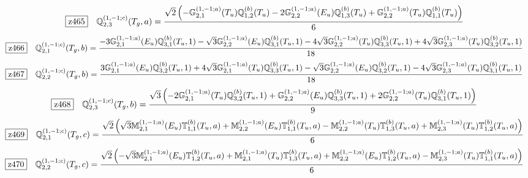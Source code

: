 \documentclass[fleqn,10pt,landscape]{jsarticle}
\begin{document}
\begin{dmath*}
\hspace*{3mm}\fbox{z465}\quad \mathbb{Q}_{2,3}^{(1,-1;c)}(T_{g},a)=\frac{\sqrt{2} \left(- \mathbb{G}_{2,1}^{(1,-1;a)}(T_{u}) \mathbb{Q}_{1,2}^{(b)}(T_{u}) - 2 \mathbb{G}_{2,2}^{(1,-1;a)}(E_{u}) \mathbb{Q}_{1,3}^{(b)}(T_{u}) + \mathbb{G}_{2,2}^{(1,-1;a)}(T_{u}) \mathbb{Q}_{1,1}^{(b)}(T_{u})\right)}{6}
\end{dmath*}
\begin{dmath*}
\hspace*{3mm}\fbox{z466}\quad \mathbb{Q}_{2,1}^{(1,-1;c)}(T_{g},b)=\frac{- 3 \mathbb{G}_{2,1}^{(1,-1;a)}(E_{u}) \mathbb{Q}_{3,1}^{(b)}(T_{u},1) - \sqrt{3} \mathbb{G}_{2,2}^{(1,-1;a)}(E_{u}) \mathbb{Q}_{3,1}^{(b)}(T_{u},1) - 4 \sqrt{3} \mathbb{G}_{2,2}^{(1,-1;a)}(T_{u}) \mathbb{Q}_{3,3}^{(b)}(T_{u},1) + 4 \sqrt{3} \mathbb{G}_{2,3}^{(1,-1;a)}(T_{u}) \mathbb{Q}_{3,2}^{(b)}(T_{u},1)}{18}
\end{dmath*}
\begin{dmath*}
\hspace*{3mm}\fbox{z467}\quad \mathbb{Q}_{2,2}^{(1,-1;c)}(T_{g},b)=\frac{3 \mathbb{G}_{2,1}^{(1,-1;a)}(E_{u}) \mathbb{Q}_{3,2}^{(b)}(T_{u},1) + 4 \sqrt{3} \mathbb{G}_{2,1}^{(1,-1;a)}(T_{u}) \mathbb{Q}_{3,3}^{(b)}(T_{u},1) - \sqrt{3} \mathbb{G}_{2,2}^{(1,-1;a)}(E_{u}) \mathbb{Q}_{3,2}^{(b)}(T_{u},1) - 4 \sqrt{3} \mathbb{G}_{2,3}^{(1,-1;a)}(T_{u}) \mathbb{Q}_{3,1}^{(b)}(T_{u},1)}{18}
\end{dmath*}
\begin{dmath*}
\hspace*{3mm}\fbox{z468}\quad \mathbb{Q}_{2,3}^{(1,-1;c)}(T_{g},b)=\frac{\sqrt{3} \left(- 2 \mathbb{G}_{2,1}^{(1,-1;a)}(T_{u}) \mathbb{Q}_{3,2}^{(b)}(T_{u},1) + \mathbb{G}_{2,2}^{(1,-1;a)}(E_{u}) \mathbb{Q}_{3,3}^{(b)}(T_{u},1) + 2 \mathbb{G}_{2,2}^{(1,-1;a)}(T_{u}) \mathbb{Q}_{3,1}^{(b)}(T_{u},1)\right)}{9}
\end{dmath*}
\begin{dmath*}
\hspace*{3mm}\fbox{z469}\quad \mathbb{Q}_{2,1}^{(1,-1;c)}(T_{g},c)=\frac{\sqrt{2} \left(\sqrt{3} \mathbb{M}_{2,1}^{(1,-1;a)}(E_{u}) \mathbb{T}_{1,1}^{(b)}(T_{u},a) + \mathbb{M}_{2,2}^{(1,-1;a)}(E_{u}) \mathbb{T}_{1,1}^{(b)}(T_{u},a) - \mathbb{M}_{2,2}^{(1,-1;a)}(T_{u}) \mathbb{T}_{1,3}^{(b)}(T_{u},a) + \mathbb{M}_{2,3}^{(1,-1;a)}(T_{u}) \mathbb{T}_{1,2}^{(b)}(T_{u},a)\right)}{6}
\end{dmath*}
\begin{dmath*}
\hspace*{3mm}\fbox{z470}\quad \mathbb{Q}_{2,2}^{(1,-1;c)}(T_{g},c)=\frac{\sqrt{2} \left(- \sqrt{3} \mathbb{M}_{2,1}^{(1,-1;a)}(E_{u}) \mathbb{T}_{1,2}^{(b)}(T_{u},a) + \mathbb{M}_{2,1}^{(1,-1;a)}(T_{u}) \mathbb{T}_{1,3}^{(b)}(T_{u},a) + \mathbb{M}_{2,2}^{(1,-1;a)}(E_{u}) \mathbb{T}_{1,2}^{(b)}(T_{u},a) - \mathbb{M}_{2,3}^{(1,-1;a)}(T_{u}) \mathbb{T}_{1,1}^{(b)}(T_{u},a)\right)}{6}
\end{dmath*}
\end{document}
